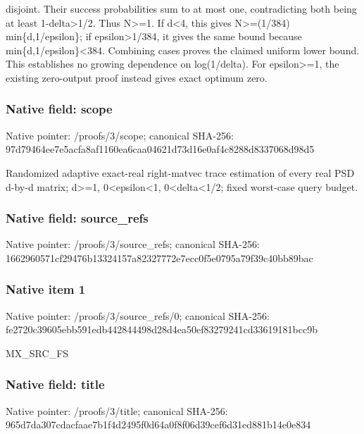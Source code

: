 \documentclass[10pt,a4paper]{article}
\begin{document}
disjoint. Their success probabilities sum to at most one,\allowbreak{} contradicting both being at least 1-delta>1/\allowbreak{}2. Thus N>=\allowbreak{}1. If d<4,\allowbreak{} this gives N>=\allowbreak{}(1/\allowbreak{}384) min\{d,\allowbreak{}1/\allowbreak{}epsilon\};\allowbreak{} if epsilon>1/\allowbreak{}384,\allowbreak{} it gives the same bound because min\{d,\allowbreak{}1/\allowbreak{}epsilon\}<384. Combining cases proves the claimed uniform lower bound. This establishes no growing dependence on log(1/\allowbreak{}delta). For epsilon>=\allowbreak{}1,\allowbreak{} the existing zero-output proof instead gives exact optimum zero.\par\endgroup

\subsubsection{Native field: scope}
Native pointer: /proofs/3/scope; canonical SHA-256: 97d79464ee7e5acfa8af1160ea6caa04621d73d16e0af4c8288d8337068d98d5

\begingroup\raggedright\sloppy Randomized adaptive exact-real right-matvec trace estimation of every real PSD d-by-d matrix;\allowbreak{} d>=\allowbreak{}1,\allowbreak{} 0<epsilon<1,\allowbreak{} 0<delta<1/\allowbreak{}2;\allowbreak{} fixed worst-case query budget.\par\endgroup

\subsubsection{Native field: source\_\allowbreak{}refs}
Native pointer: /proofs/3/source\_\allowbreak{}refs; canonical SHA-256: 1662960571cf29476b13324157a82327772e7ecc0f5e0795a79f39c40bb89bac

\subsubsection{Native item 1}
Native pointer: /proofs/3/source\_\allowbreak{}refs/0; canonical SHA-256: fe2720c39605ebb591edb442844498d28d4ea50ef83279241cd33619181bcc9b

\begingroup\raggedright\sloppy MX\_\allowbreak{}SRC\_\allowbreak{}FS\par\endgroup

\subsubsection{Native field: title}
Native pointer: /proofs/3/title; canonical SHA-256: 965d7da307cdacfaae7b1f4d2495f0d64a0f8f06d39cef6d31ed881b14e0e834
\end{document}
